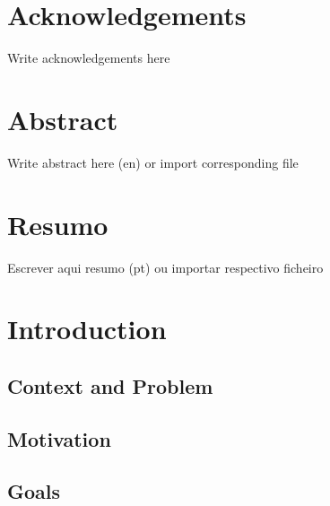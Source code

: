 \documentclass[
  oneside,
  11pt, a4paper,
  footinclude=true,
  headinclude=true,
  cleardoublepage=empty
]{scrbook}
\author{Jorge Caldas}
\date{\myear}
\begin{document}
	\umfrontcover
	\umtitlepage
	
	\chapter*{Acknowledgements}
	Write acknowledgements here

	\chapter*{Abstract}
	Write abstract here (en) or import corresponding file
	
	\cleardoublepage
	\chapter*{Resumo}
	Escrever aqui resumo (pt) ou importar respectivo ficheiro
	
	\tableofcontents
	
	
	\listoffigures
	\listoftables
	\printglossary[type=\acronymtype]
	\clearpage
	\thispagestyle{empty}
	
	
	\chapter{Introduction}
	\section{Context and Problem}
	\section{Motivation}
	\section{Goals}
	
\end{document}

